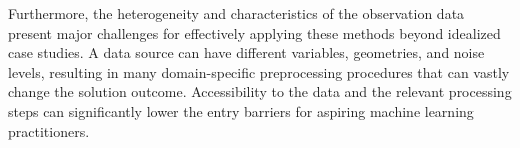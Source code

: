 Furthermore, the heterogeneity and characteristics of the observation data present major challenges for effectively applying these methods beyond idealized case studies. 
A data source can have different variables, geometries, and noise levels, resulting in many domain-specific preprocessing procedures that can vastly change the solution outcome. Accessibility to the data and the relevant processing steps can significantly lower the entry barriers for aspiring machine learning practitioners.










